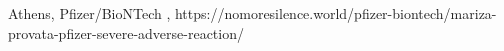           {Athens, }
          {}
          {Pfizer/BioNTech}
          {}
          {
            ,
          }
          {https://nomoresilence.world/pfizer-biontech/mariza-provata-pfizer-severe-adverse-reaction/}


